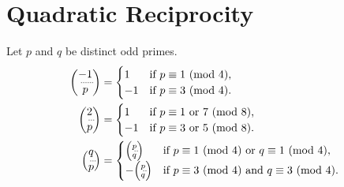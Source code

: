 \documentclass[10pt]{article}
\begin{document}
\begin{comment}
\begin{theorem}[Quadratic Reciprocity]
    (Part I) Let $p$ be an odd prime. Then
    \begin{align*}
        -1 \ \textnormal{is a quadratic residue modulo $p$} \  & \textnormal{if $p\equiv 1 \mod{4}$, and} 
        \\ -1 \ \textnormal{is a nonresidue modulo $p$} \ & \textnormal{if $p \equiv 3 \mod{4}$.}
    \end{align*}
\end{theorem}

\begin{theorem}[Primes $1 \mod{4}$ Theorem]
There are infinitely many primes congruent to $1$ modulo $4$.
\end{theorem}

\begin{theorem}[Quadratic Reciprocity]
    (Part II) Let $p$ be an odd prime. Then $2$ is a quadratic residue modulo $p$ if $p$ is congruent to $1$ or $7$ modulo $8$, and $2$ is a nonresidue modulo $p$ if $p$ is congruent to $3$ or $5$ modulo $8$. In terms of the Legendre symbol,
    \[\legendre{2}{p}=\begin{cases}
        1 & \textnormal{if $p \equiv 1$ or $7 \mod{8}$,}
        \\-1 & \textnormal{if $p \equiv 3$ or $5 \mod{8}$}.
    \end{cases}\]
\end{theorem}
\end{comment}

\section{Quadratic Reciprocity}

\begin{theorem}[\textcolor{red}{Law of Quadratic Reciprocity}]
Let $p$ and $q$ be distinct odd primes.
    \begin{align*}
        \legendre{-1}{p}&= 
        \begin{cases}
            1 & \textnormal{if $p\equiv 1 \mod{4}$,} \\
            -1 & \textnormal{if $p \equiv 3 \mod{4}$.}
        \end{cases}
        \\ \legendre{2}{p}&=
        \begin{cases}
            1 & \textnormal{if $p\equiv 1$ or $7 \mod{8}$,} \\
            -1 & \textnormal{if $p \equiv 3$ or $5 \mod{8}$.}
        \end{cases}
        \\ \legendre{q}{p}&=
        \begin{cases}
            \legendre{p}{q} & \textnormal{if $p\equiv 1 \mod{4}$ or $q \equiv 1 \mod{4}$,} \\
            -\legendre{p}{q} & \textnormal{if $p \equiv 3 \mod{4}$ and $q \equiv 3\mod{4}$.}
        \end{cases}
    \end{align*}
\end{theorem}
\end{document}
